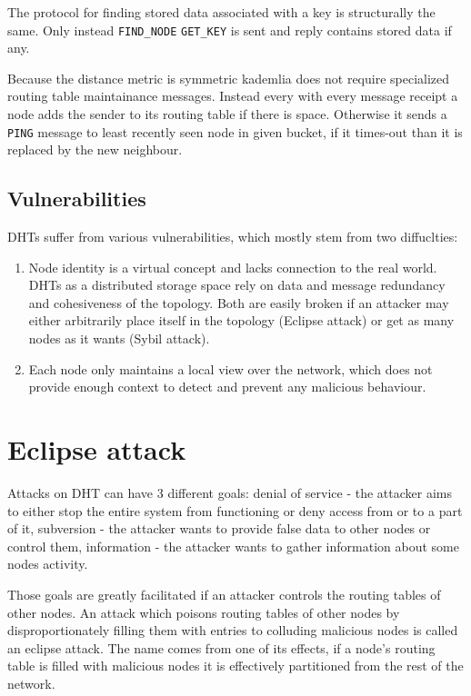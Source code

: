   The protocol for finding stored data associated with a key is structurally the
  same. Only instead \verb|FIND_NODE| \verb|GET_KEY| is sent and reply contains
  stored data if any.

  Because the distance metric is symmetric kademlia does not require specialized
  routing table maintainance messages. Instead every with every message receipt
  a node adds the sender to its routing table if there is space. Otherwise it
  sends a \verb|PING| message to least recently seen node in given bucket, if it
  times-out than it is replaced by the new neighbour.

\subsection{Vulnerabilities}
  DHTs suffer from various vulnerabilities, which mostly stem
  from two diffuclties:
  \begin{enumerate}
    \item Node identity is a virtual concept and lacks connection to the real
      world. DHTs as a distributed storage space rely on data and message
      redundancy and cohesiveness of the topology. Both are easily broken if an
      attacker may either arbitrarily place itself in the topology (Eclipse
      attack) or get as many nodes as it wants (Sybil attack).

    \item Each node only maintains a local view over the network, which does not
      provide enough context to detect and prevent any malicious behaviour.
  \end{enumerate}

\section{Eclipse attack}
  Attacks on DHT can have 3 different goals:
  denial of service - the attacker aims to either stop the entire system from
  functioning or deny access from or to a part of it,
  subversion - the attacker wants to provide false data to other nodes or
  control them,
  information - the attacker wants to gather information about some nodes
  activity.

  Those goals are greatly facilitated if an attacker controls the routing tables
  of other nodes. An attack which poisons routing tables of other nodes by
  disproportionately filling them with entries to colluding malicious nodes is
  called an eclipse attack. The name comes from one of its effects, if a node's
  routing table is filled with malicious nodes it is effectively partitioned
  from the rest of the network.

